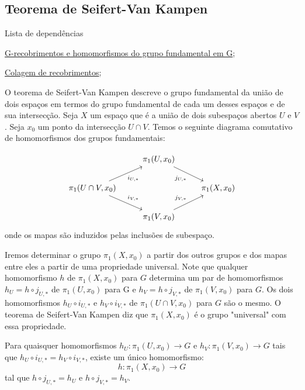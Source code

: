 \subsection{Teorema de Seifert-Van Kampen}
\label{seifert-van-kampen-prop}
\begin{titlemize}{Lista de dependências}
	\item \hyperref[homomorfismos-e-g-recobrimentos-prop]{G-recobrimentos e homomorfismos do grupo fundamental em G};\\
	\item \hyperref[colagem-de-recobrimentos-prop]{Colagem de recobrimentos};
\end{titlemize}

O teorema de Seifert-Van Kampen descreve o grupo fundamental da união de dois espaços em termos do grupo fundamental de cada um desses espaços e de sua intersecção. Seja $X$ um espaço que é a união de dois subespaços abertos $U$ e $V$. Seja $x_0$ um ponto da intersecção $U \cap V$. Temos o seguinte diagrama comutativo de homomorfismos dos grupos fundamentais:

\[\begin{tikzcd}
	& {\pi_1(U, x_0)} \\
	{\pi_1(U \cap V, x_0)} && {\pi_1(X, x_0)} \\
	& {\pi_1(V, x_0)}
	\arrow["{j_{U, *}}"', from=1-2, to=2-3]
	\arrow["{i_{U, *}}"', from=2-1, to=1-2]
	\arrow["{i_{V, *}}", from=2-1, to=3-2]
	\arrow["{j_{V, *}}", from=3-2, to=2-3]
\end{tikzcd}\]
onde os mapas são induzidos pelas inclusões de subespaço.

Iremos determinar o grupo $\pi_1(X, x_0)$ a partir dos outros grupos e dos mapas entre eles a partir de uma propriedade universal. Note que qualquer homomorfismo $h$ de $\pi_1(X, x_0)$ para $G$ determina um par de homomorfismos $h_U = h \circ j_{U, *}$ de $\pi_1(U, x_0)$ para G e $h_V = h \circ j_{V, *}$ de $\pi_1(V, x_0)$ para $G$. Os dois homomorfismos $h_U \circ i_{U, *}$ e $h_V \circ i_{V, *}$ de $\pi_1(U \cap V, x_0)$ para $G$ são o mesmo. O teorema de Seifert-Van Kampen diz que $\pi_1(X, x_0)$ é o grupo "universal" com essa propriedade.

\begin{thm} 
	Para quaisquer homomorfismos $h_U:\pi_1(U, x_0) \longrightarrow G$ e $h_V:\pi_1(V, x_0) \longrightarrow G$ tais que $h_U \circ i_{U, *} = h_V \circ i_{V, *}$, existe um único homomorfismo: $$h:\pi_1(X, x_0) \longrightarrow G$$ tal que $h \circ j_{U, *} = h_U$ e $h \circ j_{V, *} = h_V$.
\end{thm}

